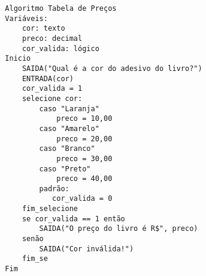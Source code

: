 \documentclass[11pt]{article}
\author{John Doe}
\date{\today}
\title{}
\begin{document}
\tableofcontents

\usepackage{fancyhdr}
\pagestyle{fancy}
\fancyhf{}

\begin{verbatim}
  Algoritmo Tabela de Preços
  Variáveis:
      cor: texto
      preco: decimal
      cor_valida: lógico
  Inicio
      SAIDA("Qual é a cor do adesivo do livro?")
      ENTRADA(cor)
      cor_valida = 1
      selecione cor:
          caso "Laranja"
              preco = 10,00
          caso "Amarelo"
              preco = 20,00
          caso "Branco"
              preco = 30,00
          caso "Preto"
              preco = 40,00
          padrão:
             cor_valida = 0 
      fim_selecione
      se cor_valida == 1 então
          SAIDA("O preço do livro é R$", preco)
      senão
          SAIDA("Cor inválida!")
      fim_se
  Fim
\end{verbatim}
\end{document}
